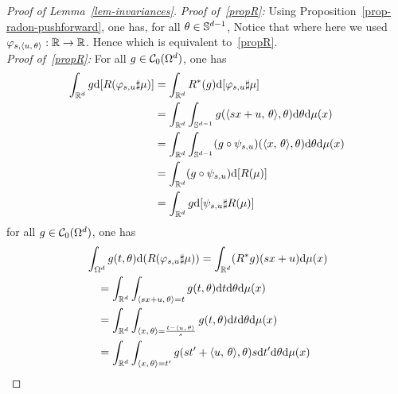 \begin{proof}[Proof of Lemma~\ref{lem-invariances}]	
		\noindent\textit{Proof of~\eqref{propR}:} 
		Using Proposition~\ref{prop-radon-pushforward}, one has, for all $\theta \in \mathbb{S}^{d-1}$, 
		Notice that
		where here we used $\varphi_{s,\langle u,\,\theta\rangle} : \mathbb{R} \rightarrow \mathbb{R}$.
		Hence
		which is equivalent to~\eqref{propR}.		\\
		\fi
		\noindent\textit{Proof of~\eqref{propR}:} 
		For all $g \in \mathcal{C}_0(\Omega^d)$, one has 
		\begin{align*}
			\int_{\mathbb{R}^d} g \mathrm{d}[ R (\varphi_{s,u} \sharp \mu)] 
				&= \int_{\mathbb{R}^d} R^*(g) \mathrm{d}[ \varphi_{s,u} \sharp \mu] \\
				&= \int_{\mathbb{R}^d} \int_{\mathbb{S}^{d-1}} g(\langle sx+u,\,\theta\rangle,\theta) \mathrm{d}\theta\mathrm{d}\mu(x) \\
				&= \int_{\mathbb{R}^d} \int_{\mathbb{S}^{d-1}} (g \circ \psi_{s,u})(\langle x,\,\theta\rangle,\theta) \mathrm{d}\theta\mathrm{d}\mu(x) \\
				&= \int_{\mathbb{R}^d} (g \circ \psi_{s,u}) \mathrm{d}[R(\mu)] \\
				& = \int_{\mathbb{R}^d} g \mathrm{d}[ \psi_{s,u} \sharp R(\mu)]
		\end{align*}		
		for all $g \in \mathcal{C}_0(\Omega^d)$, one has 
		\begin{align*}
		& \int_{\Omega^d} g(t,\theta) \mathrm{d}(R(\varphi_{s,u}\sharp \mu))  = \int_{\mathbb{R}^d}(R^* g)(s x + u) \mathrm{d}\mu(x) \\
			& \quad = \int_{\mathbb{R}^d} \int_{\langle s x + u,\,\theta\rangle=t} g(t, \theta) \mathrm{d} t \mathrm{d}\theta \mathrm{d}\mu(x) \\
			& \quad = \int_{\mathbb{R}^d}\int_{\langle x,\,\theta\rangle=\frac{t-\langle u,\,\theta\rangle}{s}} g(t, \theta) \mathrm{d} t \mathrm{d}\theta \mathrm{d}\mu(x)\\
			& \quad = \int_{\mathbb{R}^d}\int_{\langle x,\,\theta\rangle=t'} g(s t'+\langle u,\,\theta\rangle, \theta) s \mathrm{d} t' \mathrm{d}\theta \mathrm{d}\mu(x)
		\end{align*}

\end{proof}
